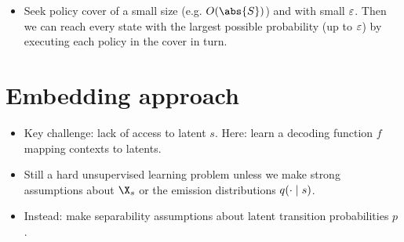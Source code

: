 \documentclass[11pt, openany]{book}
\begin{document}
\begin{itemize}
    \item Seek policy cover of a small size (e.g. $\bigoh(\abs{S})$) and with small $\varepsilon$. Then we can reach every state with the largest possible probability (up to $\varepsilon$) by executing each policy in the cover in turn.
\end{itemize}

\section{Embedding approach}
\begin{itemize}
    \item Key challenge: lack of access to latent $s$. Here: learn a decoding function $f$ mapping contexts to latents.
    \item Still a hard unsupervised learning problem unless we make strong assumptions about $\X_s$ or the emission distributions $q(\cdot\mid s)$.
    \item Instead: make separability assumptions about latent transition probabilities $p$.
\end{itemize}
\end{document}
